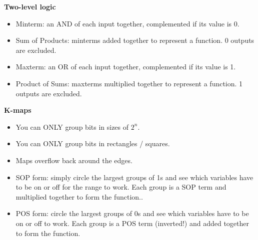 \documentclass{article}
\begin{document}
\textbf{Two-level logic}
\begin{itemize}
    \item Minterm: an AND of each input together, complemented if its value is 0.
    \item Sum of Products: minterms added together to represent a function. 0 outputs are excluded.
    \item Maxterm: an OR of each input together, complemented if its value is 1.
    \item Product of Sums: maxterms multiplied together to represent a function. 1 outputs are excluded.
\end{itemize}
\textbf{K-maps}
\begin{itemize}
    \item You can ONLY group bits in sizes of $2^n$.
    \item You can ONLY group bits in rectangles / squares.
    \item Maps overflow back around the edges.
    \item SOP form: simply circle the largest groups of 1s and see which variables have to be on or off for the range to work. Each group is a SOP term and multiplied together to form the function..
    \item POS form: circle the largest groups of 0s and see which variables have to be on or off to work. Each group is a POS term (inverted!) and added together to form the function.
\end{itemize}
\end{document}
